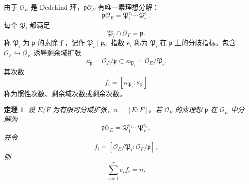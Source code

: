 \documentclass[11pt,a4paper,openany]{ctexbook}
\numberwithin{equation}{chapter}
\theoremstyle{plain}
\newtheorem{theorem}{定理}[chapter]
\theoremstyle{definition}
\theoremstyle{remark}
\begin{document}
由于 $\mathcal O_E$ 是 Dedekind 环，$\mathfrak p\mathcal O_E$ 有唯一素理想分解：
\[
\mathfrak p\mathcal O_E=\mathfrak P_1^{e_1}\cdots\mathfrak P_r^{e_r}.
\]
每个 $\mathfrak P_i$ 都满足
\[
\mathfrak P_i\cap\mathcal O_F=\mathfrak p.
\]
称 $\mathfrak P_i$ 为 $\mathfrak p$ 的素除子，记作 $\mathfrak P_i\mid\mathfrak p$。指数 $e_i$ 称为 $\mathfrak P_i$ 在 $\mathfrak p$ 上的分歧指标。包含 $\mathcal O_F\hookrightarrow\mathcal O_E$ 诱导剩余域扩张
\[
\kappa_{\mathfrak p}=\mathcal O_F/\mathfrak p
\subset
\kappa_{\mathfrak P_i}=\mathcal O_E/\mathfrak P_i.
\]
其次数
\[
f_i=[\kappa_{\mathfrak P_i}:\kappa_{\mathfrak p}]
\]
称为惯性次数、剩余域次数或剩余次数。

\begin{theorem}
设 $E/F$ 为有限可分域扩张，$n=[E:F]$。若 $\mathcal O_F$ 的素理想 $\mathfrak p$ 在 $\mathcal O_E$ 中分解为
\[
\mathfrak p\mathcal O_E=\mathfrak P_1^{e_1}\cdots\mathfrak P_r^{e_r},
\]
并令
\[
f_i=[\mathcal O_E/\mathfrak P_i:\mathcal O_F/\mathfrak p],
\]
则
\[
\sum_{i=1}^r e_i f_i=n.
\]
\end{theorem}
\end{document}
